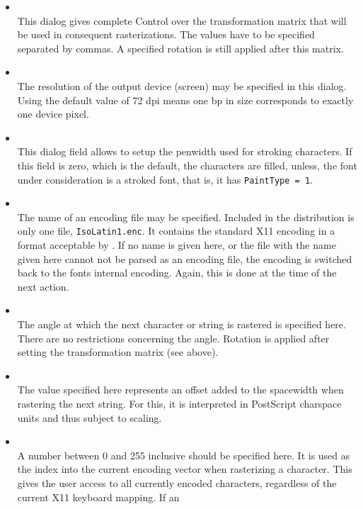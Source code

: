 \begin{itemize}
\item {}\\
  This dialog gives complete Control over the transformation matrix that will
  be used in consequent rasterizations. The values have to be specified
  separated by commas. A specified rotation is still applied after this
  matrix.  
\item {}\\
  The resolution of the output device (screen) may be specified in
  this dialog. Using the default value of 72 dpi means one bp in size
  corresponds to exactly one device pixel. 
\item {}\\
  This dialog field allows to setup the penwidth used for stroking
  characters. If this field is zero, which is the default, the characters are
  filled, unless, the font under consideration is a stroked font, that is, it
  has \verb+PaintType = 1+. 
\item {}\\
  The name of an encoding file may be specified. Included in the
  distribution is only one file, \verb+IsoLatin1.enc+. It contains the
  standard X11 encoding in a format acceptable by \tonelib. If no name
  is given here, or the file with the name given here cannot not be
  parsed as an encoding file, the encoding is switched back to the fonts
  internal encoding. Again, this is done at the time of the next
  action. 
\item {}\\
  The angle at which the next character or string is rastered is
  specified here. There are no restrictions concerning the angle. Rotation is
  applied after setting the transformation matrix (see above).
\item {}\\
  The value specified here represents an offset added to the
  spacewidth when rastering the next string. For this, it is
  interpreted in PostScript charspace units and thus subject to
  scaling. 
\item {}\\
  A number between 0 and 255 inclusive should be specified here. It is
  used as the index into the current encoding vector when rasterizing
  a character. This gives the user access to all currently encoded
  characters, regardless of the current X11 keyboard mapping. If an

\end{itemize}
